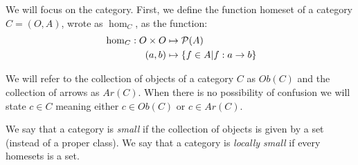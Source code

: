 We will focus on the category. First, we define the function homeset of a category $C=(O,A)$, wrote as $\hom_{C}$, as the function:
\begin{align*}
  && \hom_{C}: O \times O &\mapsto \mathcal{P}(A)&\\
  \displaystyle &\ &(a,b)&\mapsto \{f\in A | f:a\to b\}&
\end{align*}

We will refer to the collection of objects of a category $C$ as $Ob(C)$ and the collection of arrows as $Ar(C)$. When there is no possibility of confusion we will state $c\in C$ meaning either $c\in Ob(C)$ or $c\in Ar(C)$.

\begin{definition}
  We say that a category is \emph{small} if the collection of objects is given by a set (instead of a proper class). We say that a category is \emph{locally small} if every homesets is a set.
\end{definition}

